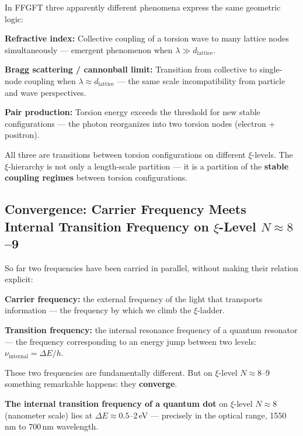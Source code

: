 \begin{foundation}
In FFGFT three apparently different phenomena
express the same geometric logic:

\textbf{Refractive index:}
Collective coupling of a torsion wave to
many lattice nodes simultaneously ---
emergent phenomenon when $\lambda \gg d_\text{lattice}$.

\textbf{Bragg scattering / cannonball limit:}
Transition from collective to single-node coupling
when $\lambda \approx d_\text{lattice}$ ---
the same scale incompatibility
from particle and wave perspectives.

\textbf{Pair production:}
Torsion energy exceeds the threshold
for new stable configurations ---
the photon reorganizes into
two torsion nodes (electron + positron).

All three are transitions between
torsion configurations on different
$\xi$-levels. The $\xi$-hierarchy is not
only a length-scale partition ---
it is a partition of the
\textbf{stable coupling regimes}
between torsion configurations.
\end{foundation}

\subsection{Convergence: Carrier Frequency Meets Internal
  Transition Frequency on \texorpdfstring{$\xi$}{xi}-Level
  \texorpdfstring{$N \approx 8$--9}{N≈8-9}}
\label{sec:convergence}

So far two frequencies have been carried in parallel,
without making their relation explicit:

\textbf{Carrier frequency:} the external frequency of the light
that transports information ---
the frequency by which we climb the $\xi$-ladder.

\textbf{Transition frequency:} the internal resonance frequency
of a quantum resonator --- the frequency
corresponding to an energy jump between two levels:
$\nu_\text{internal} = \Delta E / h$.

These two frequencies are fundamentally different.
But on $\xi$-level $N \approx 8$--9
something remarkable happens: they \textbf{converge}.

\medskip
\textbf{The internal transition frequency of a quantum dot}
on $\xi$-level $N \approx 8$ (nanometer scale)
lies at $\Delta E \approx 0.5$--2\,eV ---
precisely in the optical range,
1550\,nm to 700\,nm wavelength.

